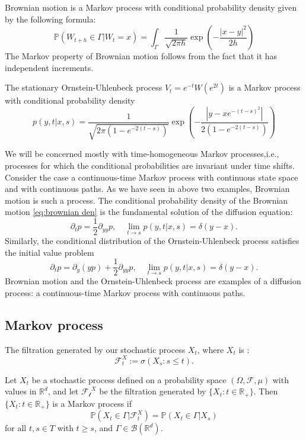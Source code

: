 \documentclass{article}
\begin{document}
\begin{example}
    Brownian motion is a Markov process with conditional probability density given by the following formula:
    \begin{equation}
        \mathbb{P}(W_{t+h} \in \Gamma |W_t=x) = \int_{\Gamma}\frac{1}{\sqrt{2\pi h}}\exp{\left(-\frac{|x-y|^2}{2h}\right)} \label{eq:brownian den}
    \end{equation}
    The Markov property of Brownian motion follows from the fact that it has independent increments.
\end{example}
\begin{example}
    The stationary Ornstein-Uhlenbeck process $V_t=e^{-t}W(e^{2t})$ is a Markov process with conditional probability density
    \begin{equation}
        p(y,t|x,s)=\frac{1}{\sqrt{2\pi (1-e^{-2(t-s)})}}\exp\left(-\frac{|y-xe^{-(t-s)^2}|}{2(1-e^{-2(t-s)})}\right)
    \end{equation}
\end{example}
We will be concerned mostly with time-homogeneous Markov processes,i.e., processes for which the conditional probabilities are invariant under time shifts.
Consider the case a continuous-time Markov process with continuous state space and with continuous paths. As we have seen in above two examples, Brownian motion is such a process. The conditional probability density of the Brownian motion \eqref{eq:brownian den} is the fundamental solution of the diffusion equation:
\begin{equation}
    \partial_t p=\frac{1}{2}\partial_{yy}p, \quad \lim_{t \to s} p(y,t|x,s)=\delta(y-x).
\end{equation}
Similarly, the conditional distribution of the Ornstein-Uhlenbeck process satisfies the initial value problem 
\begin{equation}
    \partial_t p=\partial_y(yp)+\frac{1}{2}\partial_{yy}p, \quad \lim_{t \to s} p(y,t|x,s)=\delta(y-x).
\end{equation}
Brownian motion and the Ornstein-Uhlenbeck process are examples of a diffusion process: a continuous-time Markov process with continuous paths.
\subsection*{Markov process}
The filtration generated by our stochastic process $X_t$, where $X_t$ is :
$$\mathcal{F}_t^X:=\sigma(X_s:s\leq t).$$
\begin{definition}
    Let $X_t$ be a stochastic process defined on a probability space $(\Omega,\mathcal{F},\mu)$ with values in $\mathbb{R}^d$, and let $\mathcal{F_t}^X$ be the filtration generated by $\{X_t:t \in \mathbb{R}_+\}$. Then $\{X_t:t \in \mathbb{R}_+\}$ is a Markov process if
    $$\mathbb{P}(X_t\in \Gamma |\mathcal{F}_t^X)= \mathbb{P}(X_t \in \Gamma|X_s)$$
    for all $t,s\in T$ with $t\geq s$, and $\Gamma\in \mathcal{B}(\mathbb{R}^d)$.
\end{definition}
\end{document}

